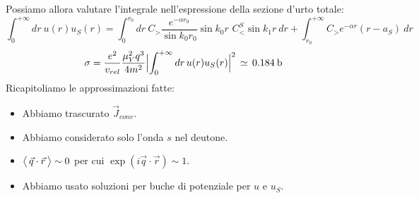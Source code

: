 Possiamo allora valutare l'integrale nell'espressione della sezione d'urto totale:
$$\int_0^{+\infty} dr \: u(r)u_S(r) = \int_0^{r_0} dr\: C_> \frac{e^{-\alpha r_0}}{\sin{k_0r_0}}\sin{k_0r}\,\, C_<^S \sin{k_1r}\:dr + \int_{r_0}^{+\infty} C_> e^{-\alpha r}(r-a_S) \: dr$$
$$\sigma = \frac{e^2}{v_{rel}}\frac{\mu^2_V q^3}{4m^2} \Bigl |\int_0^{+\infty} dr \, u(r) u_S(r)\Bigr |^2 \,\simeq\, 0.184\:\mbox{b}$$
Ricapitoliamo le approssimazioni fatte:
\begin{itemize}
    \item Abbiamo trascurato $\vec{J}_{conv}$.
    \item Abbiamo considerato solo l'onda $s$ nel deutone.
    \item $\bigl\langle\, \vec{q}\cdot\vec{r}\, \bigr\rangle\sim 0$ per cui $\exp{(i\vec{q}\cdot\vec{r})}\sim 1$.
    \item Abbiamo usato soluzioni per buche di potenziale per $u$ e $u_S$.
\end{itemize}
